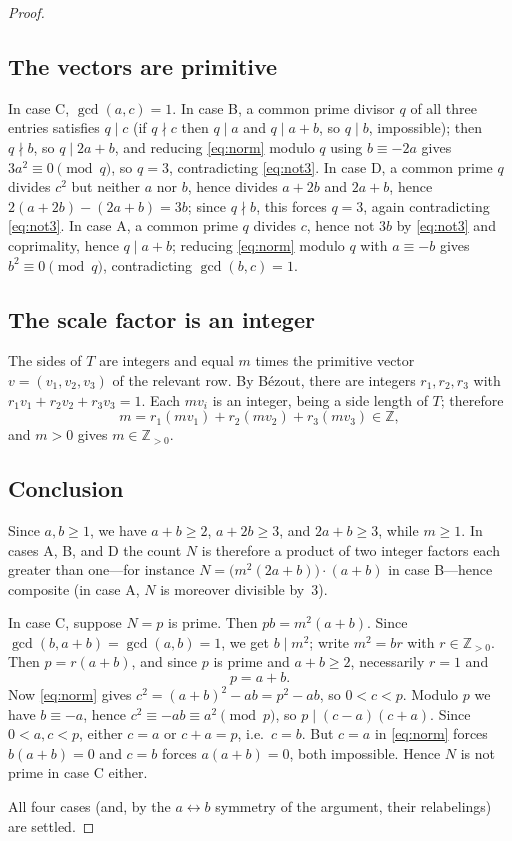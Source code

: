 \documentclass[11pt]{amsart}
\theoremstyle{remark}
\newcommand{\Z}{\mathbb{Z}}
\begin{document}
\begin{proof}
\subsection*{The vectors are primitive}
In case C, $\gcd(a,c)=1$. In case B, a common prime divisor $q$ of all three entries satisfies $q\mid c$ (if $q\nmid c$ then $q\mid a$ and $q\mid a+b$, so $q\mid b$, impossible); then $q\nmid b$, so $q\mid 2a+b$, and reducing \eqref{eq:norm} modulo $q$ using $b\equiv-2a$ gives $3a^2\equiv 0\pmod q$, so $q=3$, contradicting \eqref{eq:not3}. In case D, a common prime $q$ divides $c^2$ but neither $a$ nor $b$, hence divides $a+2b$ and $2a+b$, hence $2(a+2b)-(2a+b)=3b$; since $q\nmid b$, this forces $q=3$, again contradicting \eqref{eq:not3}. In case A, a common prime $q$ divides $c$, hence not $3b$ by \eqref{eq:not3} and coprimality, hence $q \mid a+b$; reducing \eqref{eq:norm} modulo $q$ with $a\equiv-b$ gives $b^2\equiv 0\pmod q$, contradicting $\gcd(b,c)=1$.

\subsection*{The scale factor is an integer}
The sides of $T$ are integers and equal $m$ times the primitive vector $v=(v_1,v_2,v_3)$ of the relevant row. By B\'ezout, there are integers $r_1,r_2,r_3$ with $r_1v_1+r_2v_2+r_3v_3=1$. Each $mv_i$ is an integer, being a side length of $T$; therefore
\[
m=r_1(mv_1)+r_2(mv_2)+r_3(mv_3)\in\Z,
\]
and $m>0$ gives $m\in\Z_{>0}$.

\subsection*{Conclusion}
Since $a,b\ge 1$, we have $a+b\ge 2$, $a+2b\ge 3$, and $2a+b\ge 3$, while $m\ge 1$. In cases A, B, and D the count $N$ is therefore a product of two integer factors each greater than one---for instance $N=\bigl(m^2(2a+b)\bigr)\cdot(a+b)$ in case B---hence composite (in case A, $N$ is moreover divisible by~$3$).

In case C, suppose $N=p$ is prime. Then $pb=m^2(a+b)$. Since $\gcd(b,a+b)=\gcd(a,b)=1$, we get $b\mid m^2$; write $m^2=br$ with $r\in\Z_{>0}$. Then $p=r(a+b)$, and since $p$ is prime and $a+b\ge 2$, necessarily $r=1$ and
\[
p=a+b .
\]
Now \eqref{eq:norm} gives $c^2=(a+b)^2-ab=p^2-ab$, so $0<c<p$. Modulo $p$ we have $b\equiv-a$, hence $c^2\equiv -ab\equiv a^2 \pmod p$, so $p\mid (c-a)(c+a)$. Since $0<a,c<p$, either $c=a$ or $c+a=p$, i.e.\ $c=b$. But $c=a$ in \eqref{eq:norm} forces $b(a+b)=0$ and $c=b$ forces $a(a+b)=0$, both impossible. Hence $N$ is not prime in case C either.

All four cases (and, by the $a\leftrightarrow b$ symmetry of the argument, their relabelings) are settled.
\end{proof}
\end{document}
